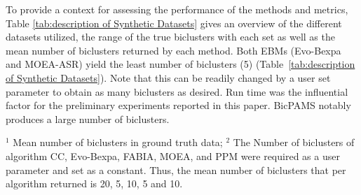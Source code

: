To provide a context for assessing the performance of the methods and metrics, Table \ref{tab:description of Synthetic Datasets} gives an overview of the different datasets utilized, the range of the true biclusters with each set as well as the mean number of biclusters returned by each method. Both EBMs (Evo-Bexpa and MOEA-ASR) yield the least number of biclusters (5) (Table~\ref{tab:description of Synthetic Datasets}). Note that this can be readily changed by a user set parameter to obtain as many biclusters as desired. Run time was the influential factor for the preliminary experiments reported in this paper. BicPAMS notably produces a large number of biclusters.


\begin{table}[!t]
\centering
   \caption{Description of Synthetic  Datasets and Mean Number of Biclusters per Algorithm}
   \label{tab:description of Synthetic Datasets}
\begin{tablenotes}
		\tiny
		\item $^{1}$ Mean number of biclusters in ground truth data;
	    $^{2}$ The Number of biclusters of algorithm CC, Evo-Bexpa, FABIA, MOEA, and PPM  were required as a user parameter and set as a constant. Thus, the mean number of biclusters that per algorithm returned is 20, 5, 10, 5 and 10.
	\end{tablenotes}
\end{table}
